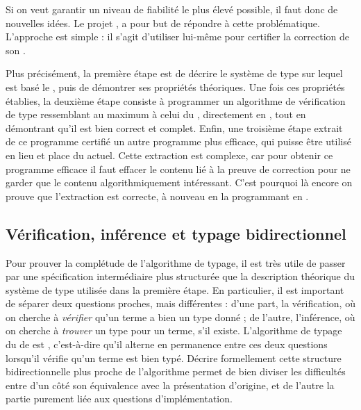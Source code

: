 Si on veut garantir un niveau de fiabilité le plus élevé possible, il faut donc de nouvelles idées.
Le projet , a pour but de répondre à cette problématique.
L’approche est simple : il s’agit d’utiliser  lui-même pour certifier la correction de son .

Plus précisément, la première étape est de décrire le système de type sur lequel est basé le , puis de démontrer ses propriétés théoriques.
Une fois ces propriétés établies, la deuxième étape consiste à programmer un algorithme de vérification de type ressemblant au maximum à celui du , directement en ,
tout en démontrant qu’il est bien correct
et complet.
Enfin, une troisième étape extrait de ce programme  certifié
un autre programme plus efficace,
qui puisse être utilisé en lieu et place du  actuel.
Cette extraction est complexe, car pour obtenir ce programme efficace il
faut effacer le contenu lié à la preuve de correction
pour ne garder que le contenu algorithmiquement intéressant.
C’est pourquoi là encore on prouve que l’extraction est correcte,
à nouveau en la programmant en .

\subsection[Typage bidirectionnel]{Vérification, inférence et typage bidirectionnel}

Pour prouver la complétude de l’algorithme de typage, il est très utile de
passer par une spécification intermédiaire plus structurée que la description
théorique du système de type utilisée dans la première étape.
En particulier, il est important de séparer deux questions proches, mais
différentes :
d’une part, la vérification, où on cherche à \emph{vérifier}
qu’un terme a bien un type
donné ; de l’autre, l’inférence, où on cherche à \emph{trouver}
un type pour un terme, s’il existe.
L’algorithme de typage du  de  est ,
c’est-à-dire qu’il alterne en permanence entre ces deux questions
lorsqu’il vérifie qu’un terme est bien typé.
Décrire formellement cette structure bidirectionnelle plus proche de l’algorithme
permet de bien diviser les difficultés entre d’un côté
son équivalence avec la présentation
d’origine, et de l’autre la partie purement liée aux questions d’implémentation.

